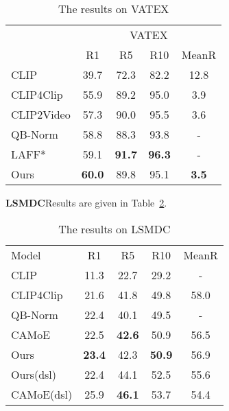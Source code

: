 \setlength{\tabcolsep}{4pt}
\begin{table}
\begin{center}
\caption{The results on VATEX}
\label{table:vatex}
\begin{tabular}{lcccc}
\hline\noalign{\smallskip}
\multirow{2}{*}{Model} & \multicolumn{4}{c}{VATEX} \\ \cline{2-5}
 & R1 & R5 & R10 & MeanR\\
\noalign{\smallskip}
\hline
\noalign{\smallskip}
CLIP & 39.7 & 72.3 & 82.2 & 12.8\\
CLIP4Clip & 55.9 & 89.2 & 95.0 & 3.9\\
CLIP2Video & 57.3 & 90.0 & 95.5 & 3.6\\
QB-Norm & 58.8 & 88.3 & 93.8 & -\\
LAFF* & 59.1 & {\bf 91.7 } & {\bf 96.3} & -\\
Ours & {\bf 60.0}  & 89.8 &  95.1 & {\bf 3.5}\\
\hline
\end{tabular}
\end{center}
\end{table}
\setlength{\tabcolsep}{1.4pt}


\textbf{LSMDC}Results are given in Table~\ref{table:lsmdc}.

\setlength{\tabcolsep}{4pt}
\begin{table}
\begin{center}
\caption{The results on LSMDC}
\label{table:lsmdc}
\begin{tabular}{lcccc}
\hline\noalign{\smallskip}
Model & R1 & R5 & R10 & MeanR\\
\noalign{\smallskip}
\hline
\noalign{\smallskip}
CLIP & 11.3 & 22.7 & 29.2 & -\\
CLIP4Clip & 21.6 & 41.8 & 49.8 & 58.0\\
QB-Norm & 22.4 & 40.1 & 49.5 & -\\
CAMoE & 22.5 & {\bf 42.6} & 50.9 & 56.5\\
Ours & {\bf 23.4}  & 42.3 &  {\bf 50.9} & 56.9\\
Ours(dsl) & 22.4 & 44.1 & 52.5 & 55.6\\
CAMoE(dsl) & 25.9 & {\bf 46.1} & 53.7 & 54.4\\
\hline
\end{tabular}
\end{center}
\end{table}
\setlength{\tabcolsep}{1.4pt}


